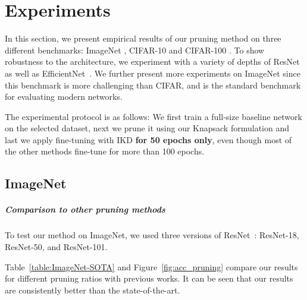 \documentclass{article}
\begin{document}
\vspace{-15pt} 
\section{Experiments}
\vspace{-5pt} 
\label{sec:exp}
In this section, we present empirical results of our pruning method on three different benchmarks: ImageNet \cite{imagenet_cvpr09}, CIFAR-10 and CIFAR-100 \cite{CIFAR}.
To show robustness to the architecture, we experiment with a variety of depths of ResNet~\cite{ResNet} as well as EfficientNet~\cite{EfficientNet}. We further present more experiments on ImageNet since this benchmark is more challenging than CIFAR, and is the standard benchmark for evaluating modern networks. 

The experimental protocol is as follows: 
We first train a full-size baseline network on the selected dataset, next we prune it using our Knapsack formulation and last we apply fine-tuning with IKD {\bf{for 50 epochs only}}, even though most of the other methods fine-tune for more than 100 epochs.



\vspace{-5pt} 
\subsection{ImageNet}
\vspace{-5pt} 
\subparagraph{Comparison to other pruning methods}
To test our method on ImageNet, we used three versions of ResNet~\cite{ResNet}: ResNet-18, ResNet-50, and ResNet-101.


Table~\ref{table:ImageNet-SOTA} and Figure~\ref{fig:acc_pruning} compare our results for different pruning ratios with previous works.
It can be seen that our results are consistently better than the state-of-the-art. 
\end{document}
